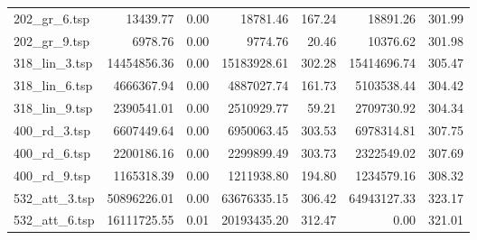 \begin{table}[H]
\begin{tabular}{|l||r|r||r|r||r|r|}
202\_gr\_6.tsp & 13439.77 & 0.00 & 18781.46 & 167.24 & 18891.26 & 301.99 \\
202\_gr\_9.tsp & 6978.76 & 0.00 & 9774.76 & 20.46 & 10376.62 & 301.98 \\
318\_lin\_3.tsp & 14454856.36 & 0.00 & 15183928.61 & 302.28 & 15414696.74 & 305.47 \\
318\_lin\_6.tsp & 4666367.94 & 0.00 & 4887027.74 & 161.73 & 5103538.44 & 304.42 \\
318\_lin\_9.tsp & 2390541.01 & 0.00 & 2510929.77 & 59.21 & 2709730.92 & 304.34 \\
400\_rd\_3.tsp & 6607449.64 & 0.00 & 6950063.45 & 303.53 & 6978314.81 & 307.75 \\
400\_rd\_6.tsp & 2200186.16 & 0.00 & 2299899.49 & 303.73 & 2322549.02 & 307.69 \\
400\_rd\_9.tsp & 1165318.39 & 0.00 & 1211938.80 & 194.80 & 1234579.16 & 308.32 \\
532\_att\_3.tsp & 50896226.01 & 0.00 & 63676335.15 & 306.42 & 64943127.33 & 323.17 \\
532\_att\_6.tsp & 16111725.55 & 0.01 & 20193435.20 & 312.47 & 0.00 & 321.01 \\
\hline
\end{tabular}
\end{table}
